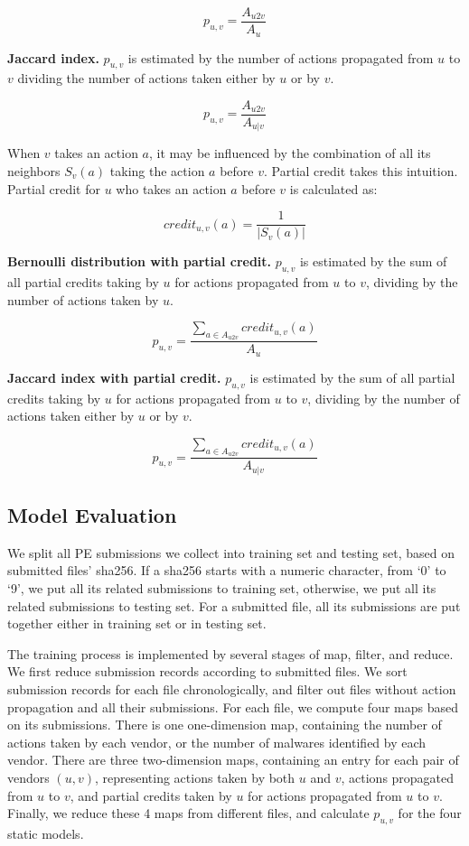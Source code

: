 $$p_{u,v} = \frac{A_{u2v}}{A_u}$$ 

{\bf Jaccard index.} 
$p_{u,v}$ is estimated by the number of actions propagated from $u$ to $v$ dividing 
the number of actions taken either by $u$ or by $v$.

$$p_{u,v} = \frac{A_{u2v}}{A_{u|v}}$$ 

When $v$ takes an action $a$, it may be influenced by the combination of all its neighbors $S_v(a)$ 
taking the action $a$ before $v$. Partial credit takes this intuition. 
Partial credit for $u$ who takes an action $a$ before $v$ is calculated as:

$$credit_{u,v}(a) = \frac{1}{|S_v(a)|}$$

{\bf Bernoulli distribution with partial credit.} 
$p_{u,v}$ is estimated by the sum of all partial credits taking by $u$ for actions propagated from $u$ to $v$, 
dividing by the number of actions taken by $u$. 

$$p_{u,v} = \frac{\sum\limits_{a \in A_{u2v}}{credit_{u,v}(a)}}{A_u}$$

{\bf Jaccard index with partial credit.} 
$p_{u,v}$ is estimated by the sum of all partial credits taking by $u$ for actions propagated from $u$ to $v$, 
dividing by the number of actions taken either by $u$ or by $v$. 

$$p_{u,v} = \frac{\sum\limits_{a \in A_{u2v}}{credit_{u,v}(a)}}{A_{u|v}}$$




\subsection{Model Evaluation}
\label{sec:predict}

We split all PE submissions we collect into training set and testing set, based on submitted files' sha256. 
If a sha256 starts with a numeric character, 
from ‘0’ to ‘9’, we put all its related submissions to training set, 
otherwise, we put all its related submissions to testing set.  
For a submitted file, all its submissions are put together either in training set or in testing set. 

The training process is implemented by several stages of map, filter, and reduce. 
We first reduce submission records according to submitted files. 
We sort submission records for each file chronologically, 
and filter out files without action propagation and all their submissions. 
For each file, we compute four maps based on its submissions.
There is one one-dimension map, 
containing the number of actions taken by each vendor, 
or the number of malwares identified by each vendor. 
There are three two-dimension maps, 
containing an entry for each pair of vendors $(u,v)$, 
representing actions taken by both $u$ and $v$, actions propagated from $u$ to $v$, 
and partial credits taken by $u$ for actions propagated from $u$ to $v$. 
Finally, we reduce these 4 maps from different files, 
and calculate $p_{u,v}$ for the four static models. 

